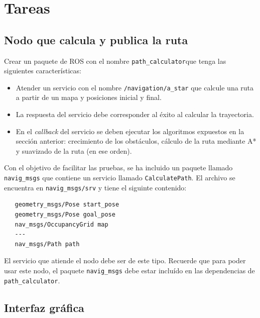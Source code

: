 \documentclass[letterpaper,12pt]{article}
\begin{document}
\section{Tareas}

\subsection{Nodo que calcula y publica la ruta}
Crear un paquete de ROS con el nombre \texttt{path_calculator}que tenga las siguientes características:
\begin{itemize}
\item Atender un servicio con el nombre \texttt{/navigation/a_star} que calcule una ruta a partir de un mapa y posiciones inicial y final. 
\item La respuesta del servicio debe corresponder al éxito al calcular la trayectoria.
\item En el \textit{callback} del servicio se deben ejecutar los algoritmos expuestos en la sección anterior: crecimiento de los obstáculos, cálculo de la ruta mediante A* y suavizado de la ruta (en ese orden).
\end{itemize}
Con el objetivo de facilitar las pruebas, se ha incluido un paquete llamado \texttt{navig_msgs} que contiene un servicio llamado \texttt{CalculatePath}. El archivo se encuentra en \texttt{navig_msgs/srv} y tiene el siguinte contenido:
\begin{verbatim}
   geometry_msgs/Pose start_pose
   geometry_msgs/Pose goal_pose
   nav_msgs/OccupancyGrid map
   ---
   nav_msgs/Path path
\end{verbatim}
El servicio que atiende el nodo debe ser de este tipo. Recuerde que para poder usar este nodo, el paquete \texttt{navig_msgs} debe estar incluído en las dependencias de \texttt{path_calculator}.

\subsection{Interfaz gráfica}
\end{document}
